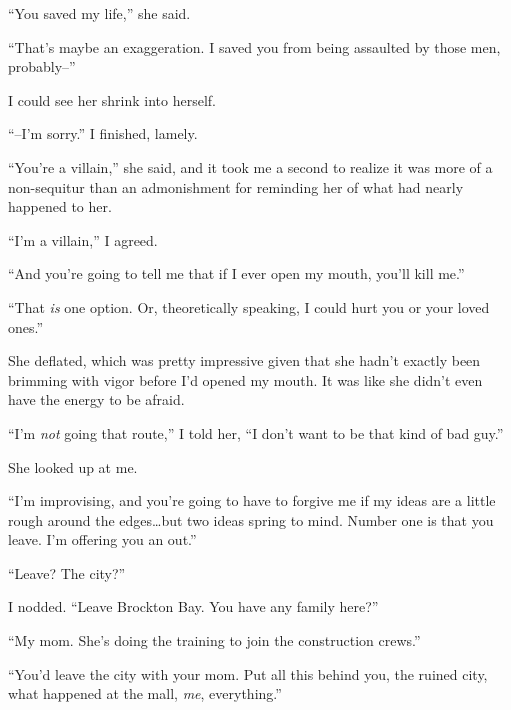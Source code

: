 ``You saved my life,'' she said.



``That's maybe an exaggeration.  I saved you from being assaulted by those men, probably--''



I could see her shrink into herself.



``--I'm sorry.''  I finished, lamely.



``You're a villain,'' she said, and it took me a second to realize it was more of a non-sequitur than an admonishment for reminding her of what had nearly happened to her.



``I'm a villain,'' I agreed.



``And you're going to tell me that if I ever open my mouth, you'll kill me.''



``That \emph{is} one option.  Or, theoretically speaking, I could hurt you or your loved ones.''



She deflated, which was pretty impressive given that she hadn't exactly been brimming with vigor before I'd opened my mouth.  It was like she didn't even have the energy to be afraid.



``I'm \emph{not} going that route,'' I told her, ``I don't want to be that kind of bad guy.''



She looked up at me.



``I'm improvising, and you're going to have to forgive me if my ideas are a little rough around the edges\ldots but two ideas spring to mind.  Number one is that you leave.  I'm offering you an out.''



``Leave?  The city?''



I nodded.  ``Leave Brockton Bay.  You have any family here?''



``My mom.  She's doing the training to join the construction crews.''



``You'd leave the city with your mom.  Put all this behind you, the ruined city, what happened at the mall, \emph{me}, everything.''



